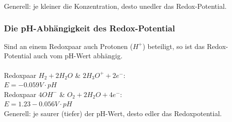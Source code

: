 Generell: je kleiner die Konzentration, desto unedler das Redox-Potential.

\subsubsection{Die pH-Abhängigkeit des Redox-Potential}
Sind an einem Redoxpaar auch Protonen ($H^+$) beteiligt, so ist das Redox-Potential auch vom pH-Wert abhängig.\\\\
Redoxpaar $H_2 + 2 H_2O$ \& $2 H_3O^+ + 2 e^-$: \\ $E = -0.059V \cdot pH$ \\
Redoxpaar $4 OH^-$ \& $O_2 + 2 H_2O + 4 e^-$: \\ $E = 1.23 - 0.056V \cdot pH$ \\

Generell: je saurer (tiefer) der pH-Wert, desto edler das Redoxpotential. \\


